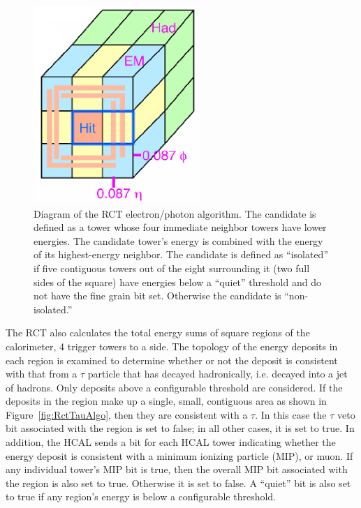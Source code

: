  \begin{figure}[htb]
  \begin{center}
    \includegraphics[width=180pt]{Figures/RCT-EG-algo.png} 
  \end{center}
  \caption[\fixspacing Diagram of the RCT electron/photon algorithm]{
    \fixspacing Diagram of the RCT electron/photon algorithm. 
    The candidate is defined as a tower whose four 
    immediate neighbor towers have lower energies.  
    The candidate tower's energy is combined with 
    the energy of its highest-energy neighbor.  
    The candidate is defined as ``isolated'' if 
    five contiguous towers out of the eight 
    surrounding it (two full sides of the square) 
    have energies below a ``quiet'' threshold 
    and do not have the fine grain bit set.  
    Otherwise the candidate is ``non-isolated.''  
  }
  \label{fig:RctEgAlgo}
 \end{figure}

The RCT also calculates the total energy sums 
of square regions of the calorimeter, 
4 trigger towers to a side.  
The topology of the energy deposits in each region 
is examined to determine whether or not the 
deposit is consistent with that from 
a $\tau$ particle that has decayed hadronically, 
i.e. decayed into a jet of hadrons.  
Only deposits above a configurable threshold 
are considered.  
If the deposits in the region make up a 
single, small, contiguous area as shown in 
Figure~\ref{fig:RctTauAlgo},
then they are consistent with a $\tau$.  
In this case the $\tau$ veto bit associated 
with the region is set to false; 
in all other cases, it is set to true.  
In addition, the HCAL sends a bit for each 
HCAL tower indicating whether the energy deposit 
is consistent with a minimum ionizing particle 
(MIP), or muon.  
If any individual tower's MIP bit is true, 
then the overall MIP bit associated with the region 
is also set to true.  
Otherwise it is set to false.  
A ``quiet'' bit is also set to true if 
any region's energy is below a configurable 
threshold.  

